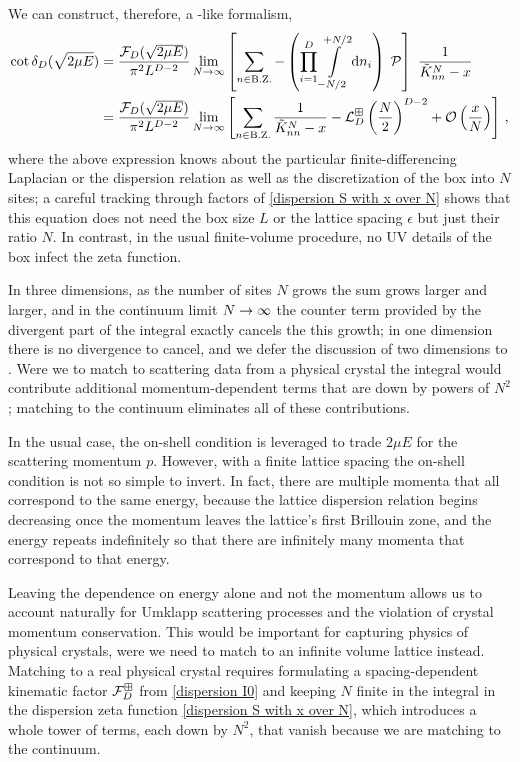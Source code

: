 We can construct, therefore, a \Luscher-like formalism,
\begin{align}
    \label{eq:dispersion quantization}
    \cot \delta_D( \sqrt{2 \mu E} )
    &=
    \frac{\mathcal{F}_D(\sqrt{2 \mu E})}{\pi^2 L^{D-2}} \lim_{N\rightarrow\infty} 
    \left[
    	\sum_{n\in\text{B.Z.}} -
		\left(\prod_{i=1}^D
    		\int\limits_{-N/2}^{+N/2}
    		\mathrm{d} n_i
    	\right)\; \mathcal{P}
	\right]\
	\frac{1}{ \tilde K_{nn}^{N} - x} 
	\\ \label{eq:dispersion S with x over N}
	&= 
	\frac{\mathcal{F}_D(\sqrt{2 \mu E})}{\pi^2 L^{D-2}}
	\lim_{N\rightarrow\infty} 
    \left[
    	\sum_{n\in\text{B.Z.}}\frac{1}{ \tilde K_{nn}^{N} - x} - \mathcal{L}_D^{\boxplus}\left(\frac{N}{2}\right)^{D-2}
		+ \mathcal O\left(\frac{x}{N}\right)
	\right]\, ,
\end{align}
where the above expression knows about the particular finite-differencing Laplacian or the dispersion relation as well as the discretization of the box into $N$ sites; a careful tracking through factors of \eqref{dispersion S with x over N} shows that this equation does not need the box size $L$ or the lattice spacing $\epsilon$ but just their ratio $N$.
In contrast, in the usual finite-volume procedure, no UV details of the box infect the zeta function.

In three dimensions, as the number of sites $N$ grows the sum grows larger and larger, and in the continuum limit $N\rightarrow\infty$ the counter term provided by the divergent part of the integral exactly cancels the this growth; in one dimension there is no divergence to cancel, and we defer the discussion of two dimensions to .
Were we to match to scattering data from a physical crystal the integral would contribute additional momentum-dependent terms that are down by powers of $N^2$; matching to the continuum eliminates all of these contributions.

In the usual case, the on-shell condition is leveraged to trade $2\mu E$ for the scattering momentum $p$.
However, with a finite lattice spacing the on-shell condition is not so simple to invert.
In fact, there are multiple momenta that all correspond to the same energy, because the lattice dispersion relation begins decreasing once the momentum leaves the lattice's first Brillouin zone, and the energy repeats indefinitely so that there are infinitely many momenta that correspond to that energy.

Leaving the dependence on energy alone and not the momentum allows us to account naturally for Umklapp scattering processes and the violation of crystal momentum conservation.
This would be important for capturing physics of physical crystals, were we need to match to an infinite volume lattice instead.
Matching to a real physical crystal requires formulating a spacing-dependent kinematic factor $\mathcal{F}_D^\boxplus$ from \eqref{dispersion I0} and keeping $N$ finite in the integral in the dispersion zeta function \eqref{dispersion S with x over N}, which introduces a whole tower of terms, each down by $N^2$, that vanish because we are matching to the continuum.


